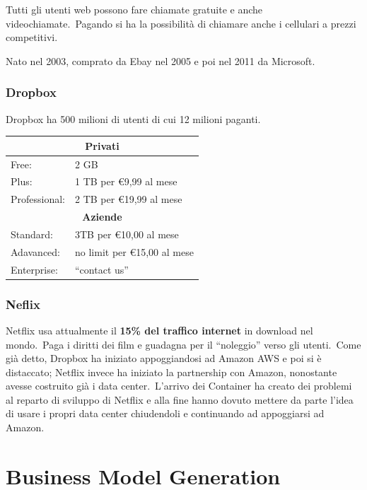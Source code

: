 Tutti gli utenti web possono fare chiamate gratuite e anche videochiamate.\
Pagando si ha la possibilità di chiamare anche i cellulari a prezzi competitivi.\

Nato nel 2003, comprato da Ebay nel 2005 e poi nel 2011 da Microsoft.

\subsubsection{Dropbox}

Dropbox ha 500 milioni di utenti di cui 12 milioni paganti.

\begin{table}[H]
    \centering
    \begin{tabular}{|l|l|}
        \hline
        \multicolumn{2}{|c|}{\textbf{Privati}}      \\\hline\hline
        Free:         & 2 GB                        \\
        Plus:         & 1 TB per €9,99 al mese      \\
        Professional: & 2 TB per €19,99 al mese     \\
        \hline\hline
        \multicolumn{2}{|c|}{\textbf{Aziende}}      \\\hline\hline
        Standard:     & 3TB per €10,00 al mese      \\
        Adavanced:    & no limit per €15,00 al mese \\
        Enterprise:   & ``contact us''              \\\hline
    \end{tabular}
\end{table}

\subsubsection{Neflix}

Netflix usa attualmente il \textbf{15\% del traffico internet} in download nel mondo.\
Paga i diritti dei film e guadagna per il ``noleggio'' verso gli utenti.\
Come già detto, Dropbox ha iniziato appoggiandosi ad Amazon AWS e poi si è distaccato; Netflix invece ha iniziato la partnership con Amazon, nonostante avesse costruito già i data center.\
L'arrivo dei Container ha creato dei problemi al reparto di sviluppo di Netflix e alla fine hanno dovuto mettere da parte l'idea di usare i propri data center chiudendoli e continuando ad appoggiarsi ad Amazon.\

\section{Business Model Generation}

